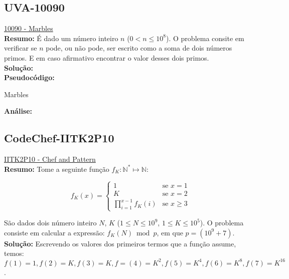 \subsection{UVA-10090}
\href{https://uva.onlinejudge.org/index.php?option=onlinejudge&page=show_problem&problem=1031}{10090 - Marbles}\\


\textbf{Resumo:}
É dado um número inteiro $n$ ($0 < n \leq 10^8$). O problema consite em verificar se $n$ pode, ou não pode, ser escrito como a soma de dois números primos.
E em caso afirmativo encontrar o valor desses dois primos.
\\

\textbf{Solução:}
\\

\textbf{Pseudocódigo:}
\begin{algorithm}
\caption{Marbles}
\begin{algorithmic}[1]

\EndProcedure
\end{algorithmic}
\end{algorithm}


\textbf{Análise:}



\subsection{CodeChef-IITK2P10}
\href{https://www.codechef.com/problems/IITK2P10}{IITK2P10 - Chef and Pattern}\\


\textbf{Resumo:}
Tome a seguinte função $f_K:\mathbb{N}^* \longmapsto \mathbb{N}$:

\[
 f_K(x) = 
  \begin{cases} 
   1 & \text{se } x = 1 \\
   K & \text{se } x = 2 \\
   \prod_{i=1}^{x-1}f_K(i) & \text{se } x \geq 3
  \end{cases}
\]

São dados dois número inteiro $N$, $K$ ($1 \leq N \leq 10^9$, $1 \leq K \leq 10^5$). O problema consiste em calcular a expressão: $f_K(N) \bmod p$, em que $p = (10^9+7)$.
\\

\textbf{Solução:}
Escrevendo os valores dos primeiros termos que a função assume, temos: $f(1)=1, f(2)=K, f(3)=K, f=(4)=K^2, f(5)=K^4, f(6)=K^8, f(7)=K^{16}$.

